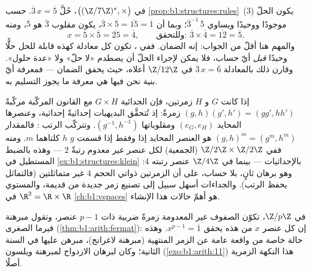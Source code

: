 \begin{example}\label{ex:b1:structures:solving}
في  $\bigl((\Z/7\Z)^*, \times\bigr)$، حُلَّ $\overline
3\,x = \overline 5$. حسب \cref{prop:b1:structures:rules}~(3) يكون
الحلّ موجودًا ووحيدًا ويساوي $\overline3^{-1}\,
\overline5$؛ وبما أن $\overline3 \times \overline5 = \overline{15}
= \overline1$، يكون مقلوب $\overline 3$ هو $\overline 5$، ومنه
\[
x = \overline5 \times \overline5 = \overline{25} = \overline4,
\qquad\text{وللتحقق: } \overline3 \times \overline4 =
\overline{12} = \overline5 .
\]
والمهم هنا أقلّ من الجواب: إنه الضمان. ففي ،
تكون كل معادلة كهذه قابلة للحل حلًّا وحيدًا \emph{قبل} أيّ
حساب، فلا يمكن لإجراء الحلّ أن يصطدم  «لا حلّ» ولا  «عدة حلول». وقارن ذلك بالمعادلة $\overline3\,x = \overline6$
في $\Z/12\Z$ أعلاه، حيث يخفق الضمان --- فمعرفة أيّ
بنية نحن فيها هي معرفة ما يجوز التسليم به.
\end{example}

\begin{example}\label{ex:b1:structures:product}
إذا كانت $G$ و $H$ زمرتين، فإن  الجدائية $G \times H$ مع
القانون المركّبة مركّبةً $(g, h)(g', h') = (gg', hh')$ زمرةٌ:
إذ تُتحقَّق البديهيات إحداثيةً إحداثية، وعنصرها المحايد
$(e_G, e_H)$ ومقلوباتها $(g^{-1}, h^{-1})$. وتتركّب الرتب : فالمقدار $(g, h)^m = (g^m, h^m)$ هو العنصر المحايد إذا وفقط إذا قسمت 
$g$  $h$ كلتاهما $m$. ومنه ففي $\Z/2\Z
\times \Z/2\Z$ (الجمعية) لكل عنصر غير معدوم رتبةٌ $2$
--- وهذه بالضبط  المستطيل في
\cref{ex:b1:structures:klein} بالإحداثيات --- بينما في $\Z/4\Z$
عنصر رتبته $4$: وهو برهان ثانٍ، بلا حساب،
على أن الزمرتين ذواتي الحجم $4$ غير متماثلتين (فالتماثل
يحفظ الرتب). والجداءات أسهل سبيل إلى
تصنيع زمر جديدة من قديمة، والمستوي $\R^2 = \R \times
\R$ في \cref{ch:b1:vspaces} هو أهمّ حالات هذا الإنشاء.
\end{example}

\begin{remark}
في  $\Z/p\Z$، تكوّن الصفوف غير المعدومة زمرةً ضربية
ذات $p - 1$ عنصر، وتقول مبرهنة فيرما الصغرى
(\cref{thm:b1:arith:fermat}): إن كل عنصر $x$ من هذه 
يحقق $x^{p-1} = \overline 1$. وهذه حالة خاصة من واقعة عامة
عن الزمر المنتهية (مبرهنة لاغرانج)، مبرهن عليها في السنة
الثانية؛ وكان لبرهان الازدواج لمبرهنة ويلسون
(\cref{exo:b1:arith:11}) هذا النكهة الزمرية أصلًا.
\end{remark}

